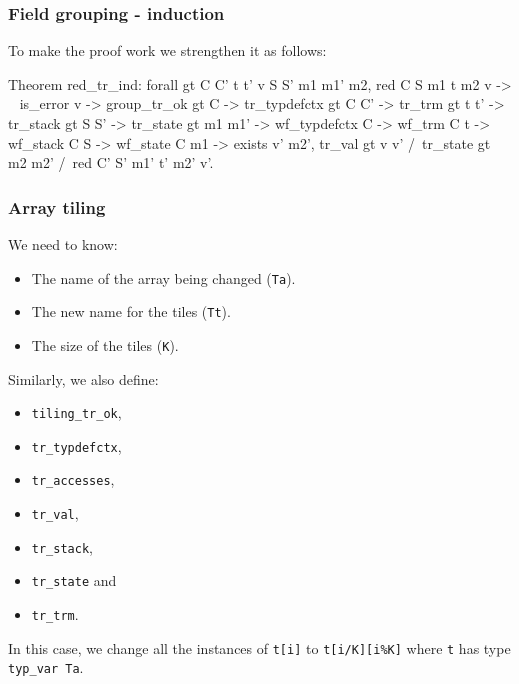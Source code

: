 \begin{frame}[fragile]
\frametitle{Field grouping - induction}

To make the proof work we strengthen it as follows:

\begin{coq}
  Theorem red_tr_ind: forall gt C C' t t' v S S' m1 m1' m2,
    red C S m1 t m2 v ->
    ~ is_error v ->
    group_tr_ok gt C ->
    tr_typdefctx gt C C' ->
    tr_trm gt t t' ->
    tr_stack gt S S' ->
    tr_state gt m1 m1' ->
    wf_typdefctx C ->
    wf_trm C t ->
    wf_stack C S ->
    wf_state C m1 ->
    exists v' m2',				tr_val gt v v'
			  /\	tr_state gt m2 m2'
			  /\	red C' S' m1' t' m2' v'.
\end{coq}

\end{frame}


\begin{frame}[fragile]
\frametitle{Array tiling}

We need to know:
\begin{itemize}
	\item The name of the array being changed (\texttt{Ta}).
	\item The new name for the tiles (\texttt{Tt}).
	\item The size of the tiles (\texttt{K}).
\end{itemize}

\bigskip \pause

Similarly, we also define:
\\[0.75em]
\begin{minipage}{0.45\linewidth}
\begin{itemize}
	\item \texttt{tiling\_tr\_ok},
	\item \texttt{tr\_typdefctx},
	\item \texttt{tr\_accesses},
	\item \texttt{tr\_val},
\end{itemize}
\end{minipage}%
\begin{minipage}{0.45\linewidth}
\begin{itemize}
	\item \texttt{tr\_stack},
	\item \texttt{tr\_state} and
	\item \texttt{tr\_trm}.
\end{itemize}
\end{minipage}

\bigskip

In this case, we change all the instances of \texttt{t[i]} to \texttt{t[i/K][i\%K]} where \texttt{t} has type \texttt{typ\_var Ta}.

\end{frame}


